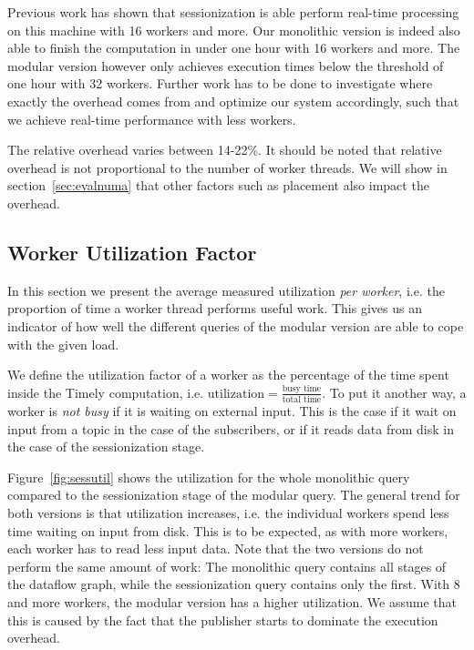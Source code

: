 Previous work has shown that sessionization is able perform real-time processing
on this machine with 16 workers and more. Our monolithic version is indeed also
able to finish the computation in under one hour with 16 workers and more.
The modular version however only achieves execution times below the threshold
of one hour with 32 workers. Further work has to be done to investigate where
exactly the overhead comes from and optimize our system accordingly, such that
we achieve real-time performance with less workers.

The relative overhead varies between 14-22\%. It should be noted that relative
overhead is not proportional to the number of worker threads. We will show
in section~\ref{sec:evalnuma} that other factors such as placement also
impact the overhead.

\subsection{Worker Utilization Factor}

In this section we present the average measured utilization \emph{per worker},
i.e. the proportion of time a worker thread performs useful work.
This gives us an indicator of how well the different queries of the modular
version are able to cope with the given load.

We define the utilization factor of a worker as the percentage of
the time spent inside the Timely computation, i.e.
$\text{utilization} = \frac{\text{busy time}}{\text{total time}}$.
To put it another way, a worker is \emph{not busy} if it is waiting on external input.
This is the case if it wait on input from a topic in the case of the subscribers, 
or if it reads data from disk in the case of the sessionization stage.

Figure~\ref{fig:sessutil} shows the utilization for the whole monolithic query
compared to the sessionization stage of the modular query. The general trend
for both versions is that utilization increases, i.e. the individual workers
spend less time waiting on input from disk. This is to be expected, as with more workers,
each worker has to read less input data. Note that the two versions do not perform
the same amount of work: The monolithic query contains all stages of the dataflow
graph, while the sessionization query contains only the first. With 8 and more
workers, the modular version has a higher utilization. We assume that this is
caused by the fact that the publisher starts to dominate the execution overhead. 

